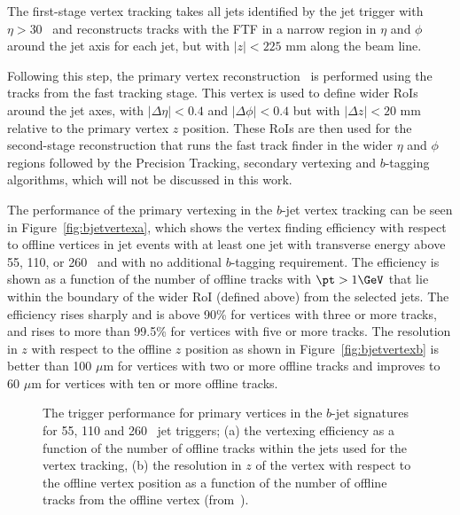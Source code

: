 				The first-stage vertex tracking takes all jets identified by the jet trigger with $\eta > 30$ \GeV\ and reconstructs tracks with the \ac{FTF} in a narrow region in $\eta$ and $\phi$ around the jet axis for each jet, but with $|z|<225$ mm along the beam line.
				
				Following this step, the primary vertex reconstruction~\cite{ATLAS-CONF-2010-069} is performed using the tracks from the fast tracking stage. This vertex is used to define wider \ac{RoI}s around
				the jet axes, with $|\Delta\eta|<0.4$ and $|\Delta\phi|<0.4$ but with $|\Delta z|<20$ mm relative to the primary vertex $z$ position. These \ac{RoI}s are then used for the second-stage 
				reconstruction that runs the fast track finder in the wider $\eta$ and $\phi$ regions followed by the Precision Tracking, secondary vertexing and $b$-tagging algorithms, which will not be discussed in this work.

				The performance of the primary vertexing in the $b$-jet vertex tracking can be seen in Figure~\ref{fig:bjetvertexa}, which shows the vertex finding efficiency with respect to 
				offline vertices in jet events with at least one jet with transverse energy above 55, 110, or 260 \GeV\ and with no additional $b$-tagging requirement. The efficiency is shown 
				as a function of the number of offline tracks with $\pt>1 \GeV$ that lie within the boundary of the wider \ac{RoI} (defined above) from the selected jets. The efficiency rises sharply and 
				is above 90\% for vertices with three or more tracks, and rises to more than 99.5\% for vertices with five or more tracks. The resolution in $z$ with respect to the offline $z$ position as shown in Figure~\ref{fig:bjetvertexb} is better than 100 $\mu$m for vertices with two or more offline tracks and improves to 60 $\mu$m for vertices with ten or more offline tracks.

				\begin{figure}[!htb]
					\begin{center}
						\hspace{0.05\textwidth}
					\end{center}
					\caption{The trigger performance for primary vertices in the $b$-jet signatures for 55, 110 and 260 \GeV\ jet triggers; (a) the vertexing efficiency as a function of the number of offline tracks within the jets used for the vertex tracking, (b) the resolution in $z$ of the vertex with respect to the offline vertex position as a function of the number of offline tracks from the offline vertex (from~\cite{ATLASTrigger2015}).}
					\label{fig:bjetvertex}
				\end{figure}

